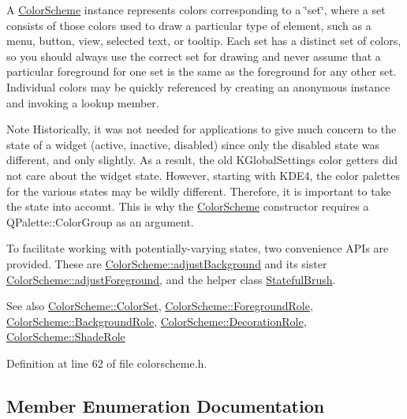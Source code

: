 A \hyperlink{class_color_scheme}{Color\+Scheme} instance represents colors corresponding to a \char`\"{}set\char`\"{}, where a set consists of those colors used to draw a particular type of element, such as a menu, button, view, selected text, or tooltip. Each set has a distinct set of colors, so you should always use the correct set for drawing and never assume that a particular foreground for one set is the same as the foreground for any other set. Individual colors may be quickly referenced by creating an anonymous instance and invoking a lookup member.

\begin{DoxyNote}{Note}
Historically, it was not needed for applications to give much concern to the state of a widget (active, inactive, disabled) since only the disabled state was different, and only slightly. As a result, the old K\+Global\+Settings color getters did not care about the widget state. However, starting with K\+D\+E4, the color palettes for the various states may be wildly different. Therefore, it is important to take the state into account. This is why the \hyperlink{class_color_scheme}{Color\+Scheme} constructor requires a Q\+Palette\+::\+Color\+Group as an argument.
\end{DoxyNote}
To facilitate working with potentially-\/varying states, two convenience A\+PI\textquotesingle{}s are provided. These are \hyperlink{class_color_scheme_a6f5d2968152d0d1f76c1e6720c185850}{Color\+Scheme\+::adjust\+Background} and its sister \hyperlink{class_color_scheme_a3d2585cb284a9c5efa5c82feb9499251}{Color\+Scheme\+::adjust\+Foreground}, and the helper class \hyperlink{class_stateful_brush}{Stateful\+Brush}.

\begin{DoxySeeAlso}{See also}
\hyperlink{class_color_scheme_a56ea451e86dffa1822ed087902844e05}{Color\+Scheme\+::\+Color\+Set}, \hyperlink{class_color_scheme_ab0f331e829838e82757088db8ce32ab4}{Color\+Scheme\+::\+Foreground\+Role}, \hyperlink{class_color_scheme_a70715e73df1fb0f140797633f8043a8c}{Color\+Scheme\+::\+Background\+Role}, \hyperlink{class_color_scheme_a4ad022af301e30791c6c248e1fc656cf}{Color\+Scheme\+::\+Decoration\+Role}, \hyperlink{class_color_scheme_a666c52f132343e360756a126d558cdd6}{Color\+Scheme\+::\+Shade\+Role} 
\end{DoxySeeAlso}


Definition at line 62 of file colorscheme.\+h.



\subsection{Member Enumeration Documentation}
\mbox{\label{class_color_scheme_a70715e73df1fb0f140797633f8043a8c}} 

